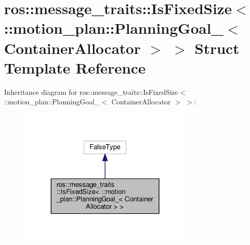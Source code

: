 \hypertarget{structros_1_1message__traits_1_1IsFixedSize_3_01_1_1motion__plan_1_1PlanningGoal___3_01ContainerAllocator_01_4_01_4}{}\section{ros\+:\+:message\+\_\+traits\+:\+:Is\+Fixed\+Size$<$ \+:\+:motion\+\_\+plan\+:\+:Planning\+Goal\+\_\+$<$ Container\+Allocator $>$ $>$ Struct Template Reference}
\label{structros_1_1message__traits_1_1IsFixedSize_3_01_1_1motion__plan_1_1PlanningGoal___3_01ContainerAllocator_01_4_01_4}


Inheritance diagram for ros\+:\+:message\+\_\+traits\+:\+:Is\+Fixed\+Size$<$ \+:\+:motion\+\_\+plan\+:\+:Planning\+Goal\+\_\+$<$ Container\+Allocator $>$ $>$\+:
\nopagebreak
\begin{figure}[H]
\begin{center}
\leavevmode
\includegraphics[width=240pt]{structros_1_1message__traits_1_1IsFixedSize_3_01_1_1motion__plan_1_1PlanningGoal___3_01Container6c44c77f356c46fea2ec87eee53f7481}
\end{center}
\end{figure}


